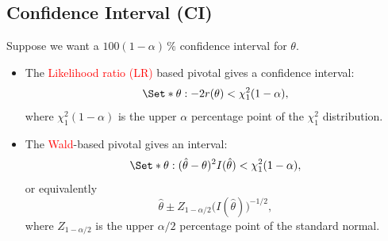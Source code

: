 \documentclass[oneside]{book}\usepackage[]{graphicx}\usepackage[svgnames]{xcolor}
\begin{document}
\subsection*{Confidence Interval (CI)}
Suppose we want a $ 100(1-\alpha)\, \% $ confidence interval for $ \theta $.
\begin{itemize}
      \item The \textcolor{Red}{Likelihood ratio (LR)} based pivotal gives a confidence interval:
            \[ \Set*{\theta:-2r(\theta)<\chi^2_{1}(1-\alpha)}, \]
            where $ \chi^2_1(1-\alpha) $ is the upper $ \alpha $ percentage point of the $ \chi^2_1 $ distribution.
      \item The \textcolor{Red}{Wald}-based pivotal gives an interval:
            \[ \Set*{\theta:(\hat{\theta}-\theta)^2 I(\hat{\theta})<\chi^2_1(1-\alpha)}, \]
            or equivalently
            \[ \hat{\theta}\pm Z_{1-\alpha/2}\bigl(I(\hat{\theta})\bigr)^{-1/2}, \]
            where $ Z_{1-\alpha/2} $ is the upper $ \alpha/2 $ percentage point of the standard normal.
\end{itemize}
\end{document}
